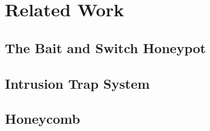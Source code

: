 \chapter{Related Work}

\section{The Bait and Switch Honeypot}

\section{Intrusion Trap System}

\section{Honeycomb}


